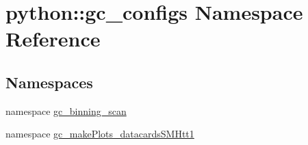 \hypertarget{namespacepython_1_1gc__configs}{
\section{python::gc\_\-configs Namespace Reference}
\label{namespacepython_1_1gc__configs}
}
\subsection*{Namespaces}
\begin{DoxyCompactItemize}
\item 
namespace \hyperlink{namespacepython_1_1gc__configs_1_1gc__binning__scan}{gc\_\-binning\_\-scan}
\item 
namespace \hyperlink{namespacepython_1_1gc__configs_1_1gc__makePlots__datacardsSMHtt1}{gc\_\-makePlots\_\-datacardsSMHtt1}
\end{DoxyCompactItemize}
